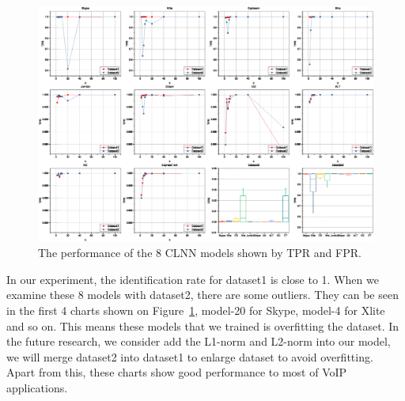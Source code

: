 \documentclass[conference]{IEEEtran}
\begin{document}
\begin{figure}[htp]
\begin{center}
\includegraphics[width=1\textwidth]{fprtpr-hpcc.eps}
\caption{The performance of the 8 CLNN models shown by TPR and FPR.}\label{fig:fprtpr}
\end{center}
\end{figure}

In our experiment, the identification rate for dataset1 is close to 1. When we examine these 8 models with dataset2, there are some outliers. They can be seen in the first 4 charts shown on Figure~\ref{fig:fprtpr}, model-20 for Skype, model-4 for Xlite and so on. This means these models that we trained is overfitting the dataset. In the future research, we consider add the L1-norm and L2-norm into our model, we will merge dataset2 into dataset1 to enlarge dataset to avoid overfitting. Apart from this, these charts show good performance to most of VoIP applications.
\end{document}
